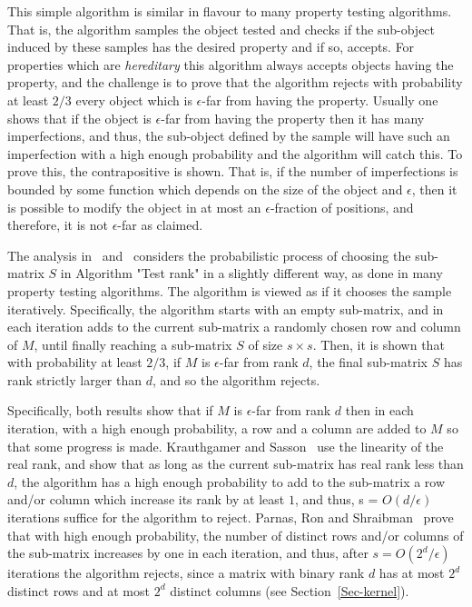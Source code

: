 \documentclass[11pt]{article}
\begin{document}
{{This simple algorithm is similar in flavour to many property testing algorithms.
That is, the algorithm samples the object tested and checks if the sub-object induced by these samples has the desired property and if so, accepts.
For properties which are {\em hereditary} this algorithm always accepts objects having the property,
and the challenge is to prove that the algorithm rejects with probability at least $2/3$ every object which is $\epsilon$-far from having the property.
Usually one shows that if the object is $\epsilon$-far from having the property then it has many imperfections,
and thus, the sub-object defined by the sample will have such an imperfection with a high enough probability and the algorithm will catch this.
To prove this, the contrapositive is shown. That is, if the number of imperfections is bounded by some function which depends on the size of the object and $\epsilon$,
then it is possible to modify the object in at most an $\epsilon$-fraction of positions, and therefore, it is not $\epsilon$-far as claimed.

The analysis in~\cite{krauthgamer2003property} and~\cite{parnas2021property} considers the probabilistic process of choosing
the sub-matrix $S$ in Algorithm "Test rank" in a slightly different way, as done in many property testing algorithms.
The algorithm is viewed as if it chooses the sample iteratively.
Specifically, the algorithm starts with an empty sub-matrix, and in each iteration adds to the current sub-matrix a randomly chosen row and column of $M$,
until finally reaching a sub-matrix $S$ of size $s \times s$.
Then, it is shown that with  probability at least $2/3$, if $M$ is $\epsilon$-far from rank $d$, the final sub-matrix $S$ has rank strictly larger than $d$, and so the algorithm rejects.

Specifically, both results show that if $M$  is $\epsilon$-far from rank $d$ then in each iteration, with a high enough probability,
a row and a column are added to $M$ so that some progress is made.
Krauthgamer and Sasson~\cite{krauthgamer2003property} use the linearity of the real rank, and show that as long as the current sub-matrix has real rank less than $d$,
the algorithm has a high enough probability to add to the sub-matrix a row and/or column which increase
its rank by at least $1$, and thus, s = $O(d/\epsilon)$ iterations suffice for the algorithm to reject.
Parnas, Ron and Shraibman~\cite{parnas2021property} prove that with high enough probability,
 the number of distinct rows and/or columns of the sub-matrix increases by one in each iteration, and thus, after $s = O(2^d/\epsilon)$ iterations the algorithm rejects,
since a matrix with binary rank $d$ has at most $2^d$ distinct rows and at most $2^d$ distinct columns (see Section~\ref{Sec-kernel}).

}}
\end{document}
